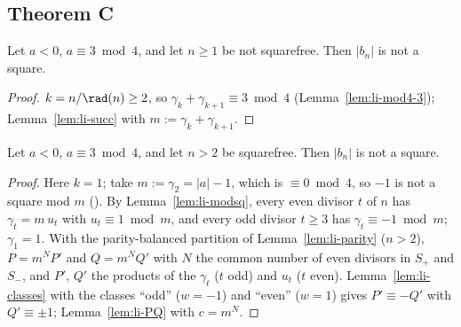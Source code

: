 \subsection*{Theorem C}

\begin{lemma}
  \label{lem:li-C-nonsqfree}
  \leanok
  Let $a < 0$, $a \equiv 3 \bmod 4$, and let $n \ge 1$ be not squarefree. Then $|b_n|$ is not a
  square.
\end{lemma}
\begin{proof}
  \leanok
  $k = n/\rad(n) \ge 2$, so $\gamma_k + \gamma_{k+1} \equiv 3 \bmod 4$ (Lemma~\ref{lem:li-mod4-3});
  Lemma~\ref{lem:li-succ} with $m := \gamma_k + \gamma_{k+1}$.
\end{proof}

\begin{lemma}
  \label{lem:li-C-sqfree}
  \leanok
  Let $a < 0$, $a \equiv 3 \bmod 4$, and let $n > 2$ be squarefree. Then $|b_n|$ is not a square.
\end{lemma}
\begin{proof}
  \leanok
  Here $k = 1$; take $m := \gamma_2 = |a| - 1$, which is $\equiv 0 \bmod 4$, so $-1$ is not a
  square mod $m$ (). By
  Lemma~\ref{lem:li-modsq}, every even divisor $t$ of $n$ has $\gamma_t = m\,u_t$ with
  $u_t \equiv 1 \bmod m$, and every odd divisor $t \ge 3$ has $\gamma_t \equiv -1 \bmod m$;
  $\gamma_1 = 1$. With the parity-balanced partition of Lemma~\ref{lem:li-parity} ($n > 2$),
  $P = m^N P'$ and $Q = m^N Q'$ with $N$ the common number of even divisors in $S_+$ and $S_-$,
  and $P'$, $Q'$ the products of the $\gamma_t$ ($t$ odd) and $u_t$ ($t$ even).
  Lemma~\ref{lem:li-classes} with the classes ``odd'' ($w = -1$) and ``even'' ($w = 1$) gives
  $P' \equiv -Q'$ with $Q' \equiv \pm 1$; Lemma~\ref{lem:li-PQ} with $c = m^N$.
\end{proof}
